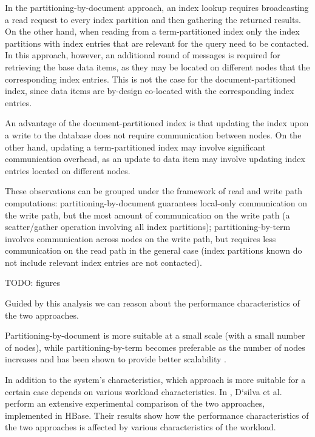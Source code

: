 In the partitioning-by-document approach, an index lookup requires broadcasting a read request to every index partition
and then gathering the returned results.
On the other hand, when reading from a term-partitioned index only the index partitions with index entries that are
relevant for the query need to be contacted.
In this approach, however, an additional round of messages is required for retrieving the base data items, as they may
be located on different nodes that the corresponding index entries.
This is not the case for the document-partitioned index, since data items are by-design co-located with the corresponding
index entries.

An advantage of the document-partitioned index is that updating the index upon a write to the database does not require
communication between nodes.
On the other hand, updating a term-partitioned index may involve significant communication overhead, as an update to data
item may involve updating index entries located on different nodes.

\bigskip

These observations can be grouped under the framework of read and write path computations:
partitioning-by-document guarantees local-only communication on the write path, but the most amount of communication on
the write path (a scatter/gather operation involving all index partitions);
partitioning-by-term involves communication across nodes on the write path, but requires less communication on the read
path in the general case (index partitions known do not include relevant index entries are not contacted).

TODO: figures

\bigskip

Guided by this analysis we can reason about the performance characteristics of the two approaches.

Partitioning-by-document is more suitable at a small scale (with a small number of nodes),
while partitioning-by-term becomes preferable as the number of nodes increases and has been shown to provide better
scalability \cite{kejriwal:slik}.

In addition to the system's characteristics, which approach is more suitable for a certain case depends on various
workload characteristics.
In \cite{dsilva:tworings}, D`silva et al. perform an extensive experimental comparison of the two approaches,
implemented in HBase.
Their results show how the performance characteristics of the two approaches is affected by various characteristics of
the workload.

